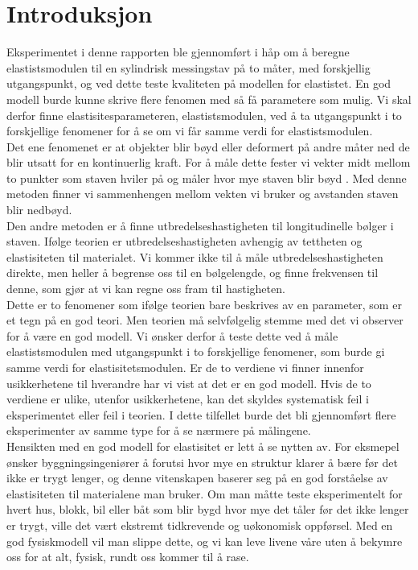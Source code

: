 \documentclass[%
 reprint,
 amsmath,amssymb,
 aps,
]{revtex4-1}
\begin{document}
\section{Introduksjon}
Eksperimentet i denne rapporten ble gjennomført i håp om å beregne elastistsmodulen til en sylindrisk messingstav på to måter, med forskjellig utgangspunkt, og ved dette teste kvaliteten på modellen for elastistet. En god modell burde kunne skrive flere fenomen med så få parametere som mulig. Vi skal derfor finne elastisitesparameteren, elastistsmodulen, ved å ta utgangspunkt i to forskjellige fenomener for å se om vi får samme verdi for elastistsmodulen.\\
Det ene fenomenet er at objekter blir bøyd eller deformert på andre måter ned de blir utsatt for en kontinuerlig kraft. For å måle dette fester vi vekter midt mellom to punkter som staven hviler på og måler hvor mye staven blir bøyd . Med denne metoden finner vi sammenhengen mellom vekten vi bruker og avstanden staven blir nedbøyd.\\
Den andre metoden er å finne utbredelseshastigheten til longitudinelle bølger i staven. Ifølge teorien er utbredelseshastigheten avhengig av tettheten og elastisiteten til materialet. Vi kommer ikke til å måle utbredelseshastigheten direkte, men heller å begrense oss til en bølgelengde, og finne frekvensen til denne, som gjør at vi kan regne oss fram til hastigheten.\\
Dette er to fenomener som ifølge teorien bare beskrives av en parameter, som er et tegn på en god teori. Men teorien må selvfølgelig stemme med det vi observer for å være en god modell. Vi ønsker derfor å teste dette ved å måle elastistsmodulen med utgangspunkt i to forskjellige fenomener, som burde gi samme verdi for elastisitetsmodulen. Er de to verdiene vi finner innenfor usikkerhetene til hverandre har vi vist at det er en god modell. Hvis de to verdiene er ulike, utenfor usikkerhetene, kan det skyldes systematisk feil i eksperimentet eller feil i teorien. I dette tilfellet burde det bli gjennomført flere eksperimenter av samme type for å se nærmere på målingene.\\
Hensikten med en god modell for elastisitet er lett å se nytten av. For eksmepel ønsker byggningsingeniører å forutsi hvor mye en struktur klarer å bære før det ikke er trygt lenger, og denne vitenskapen baserer seg på en god forståelse av elastisiteten til materialene man bruker. Om man måtte teste eksperimentelt for hvert hus, blokk, bil eller båt som blir bygd hvor mye det tåler før det ikke lenger er trygt, ville det vært ekstremt tidkrevende og uøkonomisk oppførsel. Med en god fysiskmodell vil man slippe dette, og vi kan leve livene våre uten å bekymre oss for at alt, fysisk, rundt oss kommer til å rase.
\end{document}
